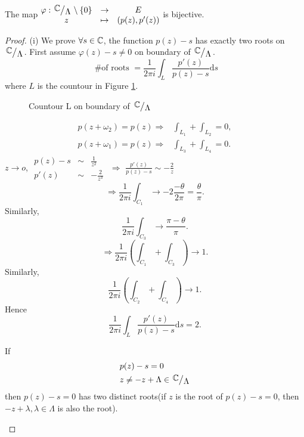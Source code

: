 \begin{proposition}
  The map $ \begin{matrix} \varphi:\sfrac{\C}{\Lambda}\setminus \{0\} &\to & E\\ z &\mapsto &(p(z),p'(z)) \end{matrix}  $ is bijective.
\end{proposition}
\begin{proof}
  (i) We prove $\forall s\in \mathbb{C}$, the function $p(z)-s$ has exactly two roots on $\sfrac{\C}{\Lambda}$. First assume $\varphi(z)-s\neq 0$ on boundary of $\sfrac{\C}{\Lambda}$.
  \[
    \text{ \# of roots }=\frac{1}{2\pi i}\int_{L} \frac{p'(z)}{p(z)-s}\mathrm{d}s
  \] 
  where $L$ is the countour in Figure \ref{fig:countour-l-on-boundary}.
\begin{figure}[ht]
    \centering
    \caption{Countour L on boundary of $\sfrac{\C}{\Lambda}$}
    \label{fig:countour-l-on-boundary}
\end{figure}
\begin{align*}
  p(z+\omega_2)=p(z)\Rightarrow & \int_{L_1}+\int_{L_2}=0,\\
  p(z+\omega_1)=p(z)\Rightarrow & \int_{L_3}+\int_{L_4}=0
.\end{align*}
$z\to o$, $\begin{matrix} p(z)-s&\sim &\frac{1}{z^2}\\p'(z)&\sim&-\frac{2}{z^3} \end{matrix}$ $\Rightarrow$ $\frac{p'(z)}{p(z)-s}\sim-\frac{2}{z}$ 
\[
\Rightarrow \frac{1}{2\pi i}\int_{C_1}\to-2 \frac{-\theta}{2\pi}=\frac{\theta}{\pi}.
\] 
Similarly,
\[
\frac{1}{2\pi i}\int_{C_3}\to \frac{\pi-\theta}{\pi}.
\] 
\[
  \Rightarrow \frac{1}{2\pi i}\left( \int_{C_1}+\int_{C_3} \right) \to 1.
\] 
Similarly,
\[
  \frac{1}{2\pi i}\left( \int_{C_2}+\int_{C_4} \right) \to 1.
\]
Hence 
\[
  \frac{1}{2\pi i}\int_{L} \frac{p'(z)}{p(z)-s}\mathrm{d}s=2.
\]

\begin{remark}
  If 
  \begin{align*}
   & p(z)-s=0\\
   & z\neq -z+\Lambda \in \sfrac{\C}{\Lambda}
  \end{align*}
  then $p(z)-s=0$ has two distinct roots(if $z$ is the root of $p(z)-s=0$, then $-z+\lambda,\lambda\in \Lambda$ is also the root).


\end{remark}
\end{proof}
